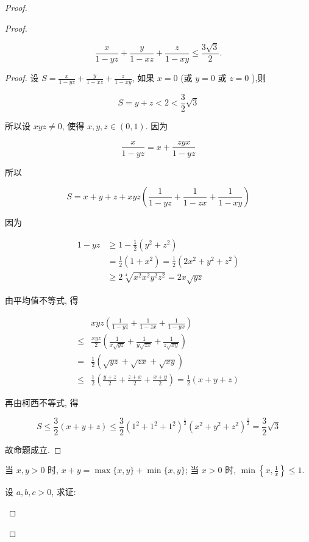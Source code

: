 \begin{proof}
\begin{example}
\begin{solution}
\begin{note}
\begin{solution}
\begin{proof}
\begin{example}
	$$
	\frac{x}{1-y z}+\frac{y}{1-x z}+\frac{z}{1-x y} \leqslant \frac{3 \sqrt{3}}{2} .
	$$
\end{example}
\begin{proof}
	设 $S=\frac{x}{1-y z}+\frac{y}{1-x z}+\frac{z}{1-x y}$, 如果 $x=0$ (或 $y=0$ 或 $z=0$ ),则
	
	$$
	S=y+z<2<\frac{3}{2} \sqrt{3}
	$$
	
	所以设 $x y z \neq 0$, 使得 $x, y, z \in(0,1)$. 因为
	
	$$
	\frac{x}{1-y z}=x+\frac{z y x}{1-y z}
	$$
	
	所以
	
	$$
	S=x+y+z+x y z\left(\frac{1}{1-y z}+\frac{1}{1-z x}+\frac{1}{1-x y}\right)
	$$
	
	因为
	
	$$
	\begin{aligned}
	1-y z & \geqslant 1-\frac{1}{2}\left(y^{2}+z^{2}\right) \\
	& =\frac{1}{2}\left(1+x^{2}\right)=\frac{1}{2}\left(2 x^{2}+y^{2}+z^{2}\right) \\
	& \geqslant 2 \sqrt[4]{x^{2} x^{2} y^{2} z^{2}}=2 x \sqrt{y z}
	\end{aligned}
	$$
	
	由平均值不等式, 得
	
	$$
	\begin{aligned}
	& x y z\left(\frac{1}{1-y z}+\frac{1}{1-z x}+\frac{1}{1-y x}\right) \\
	\leqslant & \frac{x y z}{2}\left(\frac{1}{x \sqrt{y z}}+\frac{1}{y \sqrt{z x}}+\frac{1}{z \sqrt{x y}}\right) \\
	= & \frac{1}{2}(\sqrt{y z}+\sqrt{z x}+\sqrt{x y}) \\
	\leqslant & \frac{1}{2}\left(\frac{y+z}{2}+\frac{z+x}{2}+\frac{x+y}{2}\right)=\frac{1}{2}(x+y+z)
	\end{aligned}
	$$
	
	再由柯西不等式, 得
	
	$$
	S \leqslant \frac{3}{2}(x+y+z) \leqslant \frac{3}{2}\left(1^{2}+1^{2}+1^{2}\right)^{\frac{1}{2}}\left(x^{2}+y^{2}+z^{2}\right)^{\frac{1}{2}}=\frac{3}{2} \sqrt{3}
	$$
	
	故命题成立.
\end{proof}
\begin{note}
	当 $x, y>0$ 时, $x+y=\max \{x, y\}+\min \{x, y\}$; 当 $x>0$ 时, $\min \left\{x, \frac{1}{x}\right\} \leqslant 1$.
\end{note}

\begin{example}
	设 $a, b, c>0$, 求证:
	

\end{example}
\end{proof}
\end{solution}
\end{note}
\end{solution}
\end{example}
\end{proof}
